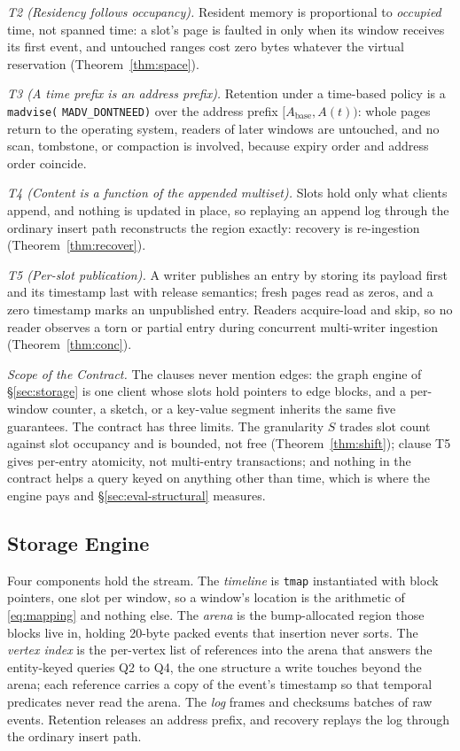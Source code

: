 \documentclass[sigconf,nonacm]{acmart}
\newcommand{\tmap}{\texttt{tmap}\xspace}
\begin{document}
\emph{T2 (Residency follows occupancy).} Resident memory is proportional
to \emph{occupied} time, not spanned time: a slot's page is faulted in
only when its window receives its first event, and untouched ranges cost
zero bytes whatever the virtual reservation (Theorem~\ref{thm:space}).

\emph{T3 (A time prefix is an address prefix).} Retention under a
time-based policy is a \texttt{madvise(}\allowbreak
\texttt{MADV\_DONTNEED)} over the address prefix
$[A_{\mathrm{base}}, A(t))$: whole pages return to the operating system,
readers of later windows are untouched, and no scan, tombstone, or
compaction is involved, because expiry order and address order coincide.

\emph{T4 (Content is a function of the appended multiset).} Slots
hold only what clients append, and nothing is updated in place, so
replaying an append log through the ordinary insert path reconstructs
the region exactly: recovery is re-ingestion
(Theorem~\ref{thm:recover}).

\emph{T5 (Per-slot publication).} A writer publishes an entry by storing
its payload first and its timestamp last with release semantics; fresh
pages read as zeros, and a zero timestamp marks an unpublished entry.
Readers acquire-load and skip, so no reader observes a torn or partial
entry during concurrent multi-writer ingestion
(Theorem~\ref{thm:conc}).

\emph{Scope of the Contract.} The clauses never mention edges: the
graph engine of \S\ref{sec:storage} is one client whose slots hold
pointers to edge blocks, and a per-window counter, a sketch, or a
key-value segment inherits the same five guarantees. The contract has
three limits. The granularity $S$ trades slot count against slot
occupancy and is bounded, not free (Theorem~\ref{thm:shift}); clause T5
gives per-entry atomicity, not multi-entry transactions; and nothing in
the contract helps a query keyed on anything other than time, which is
where the engine pays and \S\ref{sec:eval-structural} measures.

\subsection{Storage Engine}\label{sec:overview-storage}
Four components hold the stream. The \emph{timeline} is \tmap
instantiated with block pointers, one slot per window, so a window's
location is the arithmetic of \cref{eq:mapping} and nothing else. The
\emph{arena} is the bump-allocated region those blocks live in, holding
20-byte packed events that insertion never sorts. The \emph{vertex
index} is the per-vertex list of references into the arena that
answers the entity-keyed queries Q2 to Q4, the one structure a write
touches beyond the arena; each reference carries a copy of the event's
timestamp so that temporal predicates never read the arena. The
\emph{log} frames and checksums batches of raw events. Retention releases an address prefix, and recovery replays the log
through the ordinary insert path.
\end{document}
